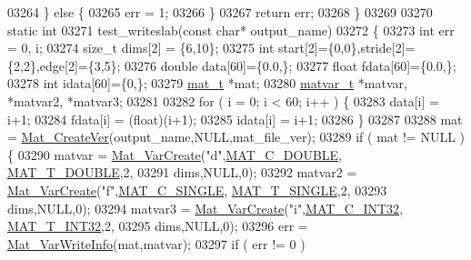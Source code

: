 \begin{DoxyCode}
{{{{{{{{{{{{{{{{{{{{{{{{{{{{{{{{{{{{{{{{{{{{{{{{{{{{{{{{{{{{03264     \} \textcolor{keywordflow}{else} \{
03265         err = 1;
03266     \}
03267     \textcolor{keywordflow}{return} err;
03268 \}
03269 
03270 \textcolor{keyword}{static} \textcolor{keywordtype}{int}
03271 test\_writeslab(\textcolor{keyword}{const} \textcolor{keywordtype}{char}* output\_name)
03272 \{
03273     \textcolor{keywordtype}{int}        err = 0, i;
03274     \textcolor{keywordtype}{size\_t}     dims[2] = \{6,10\};
03275     \textcolor{keywordtype}{int}        start[2]=\{0,0\},stride[2]=\{2,2\},edge[2]=\{3,5\};
03276     \textcolor{keywordtype}{double}     data[60]=\{0.0,\};
03277     \textcolor{keywordtype}{float}     fdata[60]=\{0.0,\};
03278     \textcolor{keywordtype}{int}       idata[60]=\{0,\};
03279     \hyperlink{struct__mat__t}{mat\_t}    *mat;
03280     \hyperlink{group___m_a_t_structmatvar__t}{matvar\_t} *matvar, *matvar2, *matvar3;
03281 
03282     \textcolor{keywordflow}{for} ( i = 0; i < 60; i++ ) \{
03283          data[i] = i+1;
03284         fdata[i] = (float)(i+1);
03285         idata[i] = i+1;
03286     \}
03287 
03288     mat = \hyperlink{group___m_a_t_ga22d404f203af7869c841400e7ad247cf}{Mat\_CreateVer}(output\_name,NULL,mat\_file\_ver);
03289     \textcolor{keywordflow}{if} ( mat != NULL ) \{
03290         matvar = \hyperlink{group___m_a_t_ga1c54a84bb4d810c6fccdb8869489eac4}{Mat\_VarCreate}(\textcolor{stringliteral}{"d"},\hyperlink{group___m_a_t_ggad4d60ae7b709fc81bfd744fb4c857c40a5d70e0862e5bdb7bd86bf7ba5948f307}{MAT\_C\_DOUBLE},
      \hyperlink{group___m_a_t_ggacf7b3b879282b7ab3a51190e49bf3453a31e721ecf7e188196f83c32838288797}{MAT\_T\_DOUBLE},2,
03291                        dims,NULL,0);
03292         matvar2 = \hyperlink{group___m_a_t_ga1c54a84bb4d810c6fccdb8869489eac4}{Mat\_VarCreate}(\textcolor{stringliteral}{"f"},\hyperlink{group___m_a_t_ggad4d60ae7b709fc81bfd744fb4c857c40a2825631e26a961cbe0f79db50a39cea2}{MAT\_C\_SINGLE},
      \hyperlink{group___m_a_t_ggacf7b3b879282b7ab3a51190e49bf3453a3a3657d40e9212c923d9b9d03531b64c}{MAT\_T\_SINGLE},2,
03293                        dims,NULL,0);
03294         matvar3 = \hyperlink{group___m_a_t_ga1c54a84bb4d810c6fccdb8869489eac4}{Mat\_VarCreate}(\textcolor{stringliteral}{"i"},\hyperlink{group___m_a_t_ggad4d60ae7b709fc81bfd744fb4c857c40adb44fc39694e3152ae5e69470a2fefe8}{MAT\_C\_INT32},
      \hyperlink{group___m_a_t_ggacf7b3b879282b7ab3a51190e49bf3453a83e06a68320726c6572bfbb9f3addb1d}{MAT\_T\_INT32},2,
03295                        dims,NULL,0);
03296         err = \hyperlink{group___m_a_t_ga1ae164415dfd98cdf48ad07033b6e0bb}{Mat\_VarWriteInfo}(mat,matvar);
03297         \textcolor{keywordflow}{if} ( err != 0 )
}}}}}}}}}}}}}}}}}}}}}}}}}}}}}}}}}}}}}}}}}}}}}}}}}}}}}}}}}}}}
\end{DoxyCode}
